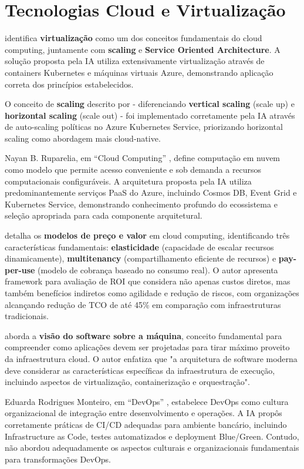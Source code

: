 \section{Tecnologias Cloud e Virtualização}

 identifica \textbf{virtualização} como um dos conceitos fundamentais do cloud computing, juntamente com \textbf{scaling} e \textbf{Service Oriented Architecture}. A solução proposta pela IA utiliza extensivamente virtualização através de containers Kubernetes e máquinas virtuais Azure, demonstrando aplicação correta dos princípios estabelecidos.

O conceito de \textbf{scaling} descrito por  - diferenciando \textbf{vertical scaling} (scale up) e \textbf{horizontal scaling} (scale out) - foi implementado corretamente pela IA através de auto-scaling políticas no Azure Kubernetes Service, priorizando horizontal scaling como abordagem mais cloud-native.

Nayan B. Ruparelia, em ``Cloud Computing'' , define computação em nuvem como modelo que permite acesso conveniente e sob demanda a recursos computacionais configuráveis. A arquitetura proposta pela IA utiliza predominantemente serviços PaaS do Azure, incluindo Cosmos DB, Event Grid e Kubernetes Service, demonstrando conhecimento profundo do ecossistema e seleção apropriada para cada componente arquitetural.

 detalha os \textbf{modelos de preço e valor} em cloud computing, identificando três características fundamentais: \textbf{elasticidade} (capacidade de escalar recursos dinamicamente), \textbf{multitenancy} (compartilhamento eficiente de recursos) e \textbf{pay-per-use} (modelo de cobrança baseado no consumo real). O autor apresenta framework para avaliação de ROI que considera não apenas custos diretos, mas também benefícios indiretos como agilidade e redução de riscos, com organizações alcançando redução de TCO de até 45\% em comparação com infraestruturas tradicionais.

 aborda a \textbf{visão do software sobre a máquina}, conceito fundamental para compreender como aplicações devem ser projetadas para tirar máximo proveito da infraestrutura cloud. O autor enfatiza que "a arquitetura de software moderna deve considerar as características específicas da infraestrutura de execução, incluindo aspectos de virtualização, containerização e orquestração".

Eduarda Rodrigues Monteiro, em ``DevOps'' , estabelece DevOps como cultura organizacional de integração entre desenvolvimento e operações. A IA propôs corretamente práticas de CI/CD adequadas para ambiente bancário, incluindo Infrastructure as Code, testes automatizados e deployment Blue/Green. Contudo, não abordou adequadamente os aspectos culturais e organizacionais fundamentais para transformações DevOps.

